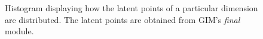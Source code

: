 \begin{figure}[h]
\begin{subfigure}[b]{0.25\textwidth}
	\end{subfigure}
	\caption{Histogram displaying how the latent points of a particular dimension are distributed. The latent points are obtained from GIM's \textit{final} module.}
	\label{fig:distr_module2_beta0}
\end{figure}